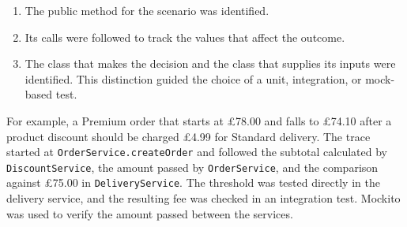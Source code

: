 \begin{enumerate}
    \item The public method for the scenario was identified.
    \item Its calls were followed to track the values that affect the
    outcome.
    \item The class that makes the decision and the class that supplies
    its inputs were identified. This distinction guided the choice of a
    unit, integration, or mock-based test.
\end{enumerate}

For example, a Premium order that starts at \pounds78.00 and falls to
\pounds74.10 after a product discount should be charged \pounds4.99
for Standard delivery. The trace started at
\texttt{OrderService.createOrder} and followed the subtotal calculated by
\texttt{DiscountService}, the amount passed by \texttt{OrderService}, and
the comparison against \pounds75.00 in \texttt{DeliveryService}. The
threshold was tested directly in the delivery service, and the resulting
fee was checked in an integration test. Mockito was used to verify the
amount passed between the services.

